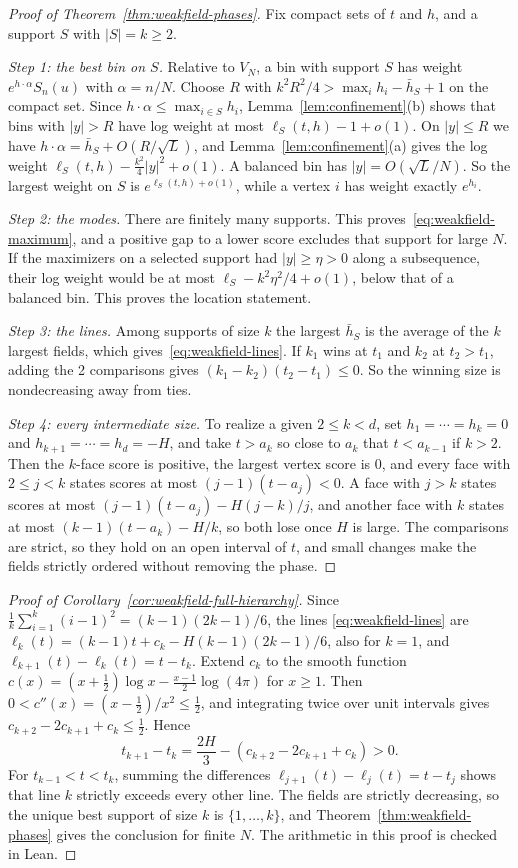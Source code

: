 \begin{proof}[Proof of Theorem~\ref{thm:weakfield-phases}]
Fix compact sets of $t$ and $h$, and a support $S$ with $|S|=k\ge2$.

\emph{Step 1: the best bin on $S$.} Relative to $V_N$, a bin with support $S$
has weight $e^{h\cdot\alpha}S_n(u)$ with $\alpha=n/N$. Choose $R$ with
$k^2R^2/4>\max_ih_i-\bar h_S+1$ on the compact set. Since
$h\cdot\alpha\le\max_{i\in S}h_i$, Lemma~\ref{lem:confinement}(b) shows that
bins with $|y|>R$ have log weight at most $\ell_S(t,h)-1+o(1)$. On $|y|\le R$ we
have $h\cdot\alpha=\bar h_S+O(R/\sqrt L)$, and Lemma~\ref{lem:confinement}(a)
gives the log weight $\ell_S(t,h)-\frac{k^2}4|y|^2+o(1)$. A balanced bin has
$|y|=O(\sqrt L/N)$. So the largest weight on $S$ is $e^{\ell_S(t,h)+o(1)}$,
while a vertex $i$ has weight exactly $e^{h_i}$.

\emph{Step 2: the modes.} There are finitely many supports. This
proves~\eqref{eq:weakfield-maximum}, and a positive gap to a lower score excludes
that support for large $N$. If the maximizers on a selected support had
$|y|\ge\eta>0$ along a subsequence, their log weight would be at most
$\ell_S-k^2\eta^2/4+o(1)$, below that of a balanced bin. This proves the
location statement.

\emph{Step 3: the lines.} Among supports of size $k$ the largest $\bar h_S$ is
the average of the $k$ largest fields, which gives~\eqref{eq:weakfield-lines}. If
$k_1$ wins at $t_1$ and $k_2$ at $t_2>t_1$, adding the 2 comparisons gives
$(k_1-k_2)(t_2-t_1)\le0$. So the winning size is nondecreasing away from ties.

\emph{Step 4: every intermediate size.} To realize a given $2\le k<d$, set
$h_1=\cdots=h_k=0$ and $h_{k+1}=\cdots=h_d=-H$, and take $t>a_k$ so close to
$a_k$ that $t<a_{k-1}$ if $k>2$. Then the $k$-face score is positive, the
largest vertex score is $0$, and every face with $2\le j<k$ states scores at
most $(j-1)(t-a_j)<0$. A face with $j>k$ states scores at most
$(j-1)(t-a_j)-H(j-k)/j$, and another face with $k$ states at most
$(k-1)(t-a_k)-H/k$, so both lose once $H$ is large. The comparisons are strict,
so they hold on an open interval of $t$, and small changes make the fields
strictly ordered without removing the phase.
\end{proof}

\begin{proof}[Proof of Corollary~\ref{cor:weakfield-full-hierarchy}]
Since $\frac1k\sum_{i=1}^k(i-1)^2=(k-1)(2k-1)/6$, the lines
\eqref{eq:weakfield-lines} are $\ell_k(t)=(k-1)t+c_k-H(k-1)(2k-1)/6$, also for
$k=1$, and $\ell_{k+1}(t)-\ell_k(t)=t-t_k$. Extend $c_k$ to the smooth function
$c(x)=(x+\frac12)\log x-\frac{x-1}2\log(4\pi)$ for $x\ge1$. Then
$0<c''(x)=(x-\frac12)/x^2\le\frac12$, and integrating twice over unit intervals
gives $c_{k+2}-2c_{k+1}+c_k\le\frac12$. Hence
\[
 t_{k+1}-t_k=\frac{2H}{3}-(c_{k+2}-2c_{k+1}+c_k)>0.
\]
For $t_{k-1}<t<t_k$, summing the differences $\ell_{j+1}(t)-\ell_j(t)=t-t_j$
shows that line $k$ strictly exceeds every other line. The fields are strictly
decreasing, so the unique best support of size $k$ is $\{1,\ldots,k\}$, and
Theorem~\ref{thm:weakfield-phases} gives the conclusion for finite $N$. The
arithmetic in this proof is checked in Lean.
\end{proof}
